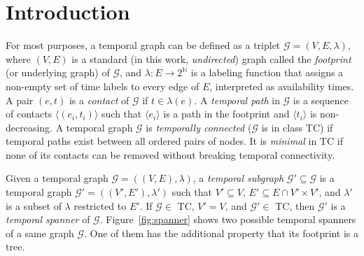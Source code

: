 \documentclass[USenglish, a4paper, thm-restate,numberwithinsect, cleveref]{lipics-v2021}
\newcommand{\G}{\ensuremath{\mathcal{G}}\xspace}
\begin{document}
\section{Introduction}


\noindent For most purposes, a temporal graph can be defined as a triplet $\G=(V,E,\lambda)$, where $(V,E)$ is a standard (in this work, \emph{undirected}) graph called the \emph{footprint} (or underlying graph) of $\G$, and $\lambda:E \to 2^{\mathbb{N}}$ is a labeling function that assigns a non-empty set of time labels to every edge of $E$, interpreted as availability times. A pair $(e,t)$ is a \emph{contact} of \G if $t \in \lambda(e)$. A \emph{temporal path} in $\G$ is a sequence of contacts $\langle (e_i,t_i)\rangle$ such that $\langle e_i \rangle$ is a path in the footprint and $\langle t_i \rangle$ is non-decreasing. %
A temporal graph \G is \emph{temporally connected} ($\G$ is in class \textsf{TC}) if temporal paths exist between all ordered pairs of nodes. It is \emph{minimal} in \textsf{TC} if none of its contacts can be removed without breaking temporal connectivity.

Given a temporal graph $\G=((V,E),\lambda)$, a \emph{temporal subgraph} $\G'\subseteq \G$ is a temporal graph $\G'=((V',E'), \lambda')$ such that $V'\subseteq V$, $E' \subseteq E \cap V'\times V'$, and $\lambda'$ is a subset of $\lambda$ restricted to $E'$. If $\G \in$ \textsf{TC}, $V'=V$, and $\G' \in $ \textsf{TC}, then $\G'$ is a \emph{temporal spanner} of $\G$. Figure~\ref{fig:spanner} shows two possible temporal spanners of a same graph $\G$. One of them has the additional property that its footprint is a tree.
\end{document}
